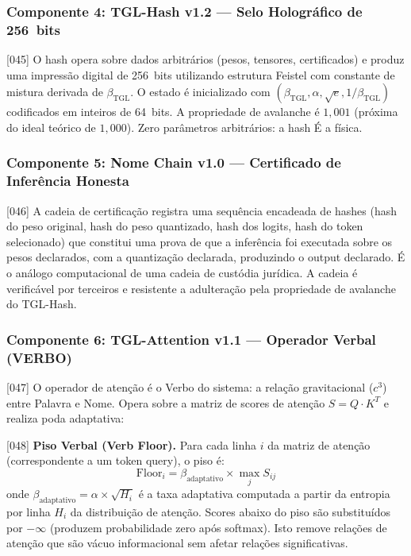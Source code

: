 \documentclass[12pt,a4paper]{article}
\newcommand{\betatgl}{\beta_{\text{TGL}}}
\begin{document}
\subsubsection{Componente 4: TGL-Hash v1.2 --- Selo Holográfico de 256~bits}
\label{sec:hash}

{[045]} O hash opera sobre dados arbitrários (pesos, tensores, certificados) e produz uma impressão digital de 256~bits utilizando estrutura Feistel com constante de mistura derivada de $\betatgl$. O estado é inicializado com $(\betatgl, \alpha, \sqrt{e}, 1/\betatgl)$ codificados em inteiros de 64~bits. A propriedade de avalanche é $1{,}001$ (próxima do ideal teórico de $1{,}000$). Zero parâmetros arbitrários: a hash É a física.

\subsubsection{Componente 5: Nome Chain v1.0 --- Certificado de Inferência Honesta}
\label{sec:chain}

{[046]} A cadeia de certificação registra uma sequência encadeada de hashes (hash do peso original, hash do peso quantizado, hash dos logits, hash do token selecionado) que constitui uma prova de que a inferência foi executada sobre os pesos declarados, com a quantização declarada, produzindo o output declarado. É o análogo computacional de uma cadeia de custódia jurídica. A cadeia é verificável por terceiros e resistente a adulteração pela propriedade de avalanche do TGL-Hash.

\subsubsection{Componente 6: TGL-Attention v1.1 --- Operador Verbal (VERBO)}
\label{sec:attention}

{[047]} O operador de atenção é o Verbo do sistema: a relação gravitacional ($c^3$) entre Palavra e Nome. Opera sobre a matriz de scores de atenção $S = Q \cdot K^T$ e realiza poda adaptativa:

{[048]} \textbf{Piso Verbal (Verb Floor).} Para cada linha $i$ da matriz de atenção (correspondente a um token query), o piso é:
\begin{equation}
\label{eq:verb_floor}
\text{Floor}_i = \beta_{\text{adaptativo}} \times \max_j S_{ij}
\end{equation}
onde $\beta_{\text{adaptativo}} = \alpha \times \sqrt{H_i}$ é a taxa adaptativa computada a partir da entropia por linha $H_i$ da distribuição de atenção. Scores abaixo do piso são substituídos por $-\infty$ (produzem probabilidade zero após softmax). Isto remove relações de atenção que são vácuo informacional sem afetar relações significativas.
\end{document}
